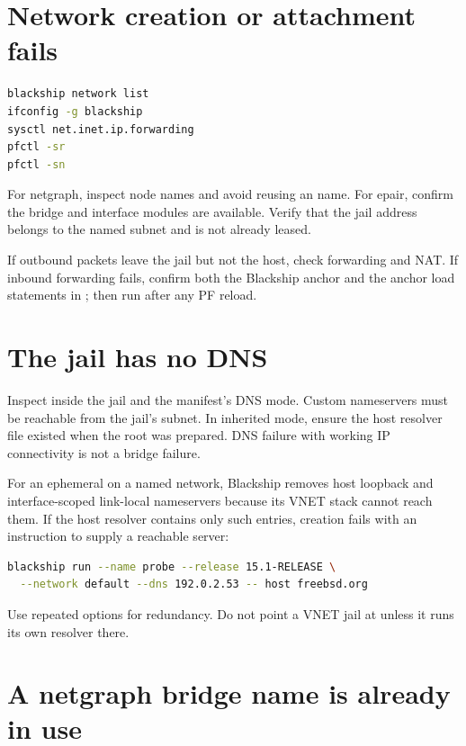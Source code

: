 \section{Network creation or attachment fails}

\begin{lstlisting}[language=bash]
blackship network list
ifconfig -g blackship
sysctl net.inet.ip.forwarding
pfctl -sr
pfctl -sn
\end{lstlisting}

For netgraph, inspect node names and avoid reusing an  name.
For epair, confirm the bridge and interface modules are available. Verify that
the jail address belongs to the named subnet and is not already leased.

If outbound packets leave the jail but not the host, check forwarding and NAT.
If inbound forwarding fails, confirm both the Blackship anchor and the anchor
load statements in ; then run  after
any PF reload.

\section{The jail has no DNS}

Inspect  inside the jail and the manifest's DNS mode.
Custom nameservers must be reachable from the jail's subnet. In inherited mode,
ensure the host resolver file existed when the root was prepared. DNS failure
with working IP connectivity is not a bridge failure.

For an ephemeral  on a named network, Blackship removes host
loopback and interface-scoped link-local nameservers because its VNET stack
cannot reach them. If the host resolver contains only such entries, creation
fails with an instruction to supply a reachable server:

\begin{lstlisting}[language=bash]
blackship run --name probe --release 15.1-RELEASE \
  --network default --dns 192.0.2.53 -- host freebsd.org
\end{lstlisting}

Use repeated  options for redundancy. Do not point a VNET jail
at \command{127.0.0.1} unless it runs its own resolver there.

\section{A netgraph bridge name is already in use}

